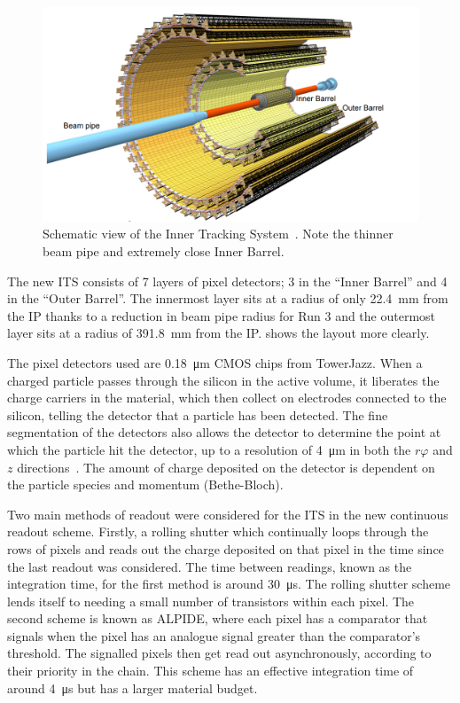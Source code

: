 \begin{figure}[h]
    \begin{center}
        \includegraphics[width=.8\textwidth]{Figs/ITS_Schematic.png}
        \caption{Schematic view of the Inner Tracking System~\cite{ITS_Upgrade_TDR}. Note the thinner beam pipe and extremely close Inner Barrel.}
        \label{fig:ITS_Schematic}
    \end{center}
\end{figure}

The new ITS consists of 7 layers of pixel detectors; 3 in the ``Inner Barrel'' and 4 in the ``Outer Barrel''. The innermost layer sits at a radius of only \SI{22.4}{\milli\metre} from the IP thanks to a reduction in beam pipe radius for Run 3 and the outermost layer sits at a radius of \SI{391.8}{\milli\metre} from the IP.  shows the layout more clearly. 

The pixel detectors used are \SI{0.18}{\micro\metre} CMOS chips from TowerJazz. When a charged particle passes through the silicon in the active volume, it liberates the charge carriers in the material, which then collect on electrodes connected to the silicon, telling the detector that a particle has been detected. The fine segmentation of the detectors also allows the detector to determine the point at which the particle hit the detector, up to a resolution of \SI{4}{\micro\metre} in both the $r\varphi$ and $z$ directions~\cite{ITS_Upgrade_TDR}. The amount of charge deposited on the detector is dependent on the particle species and momentum (Bethe-Bloch). 

Two main methods of readout were considered for the ITS in the new continuous readout scheme. Firstly, a rolling shutter which continually loops through the rows of pixels and reads out the charge deposited on that pixel in the time since the last readout was considered. The time between readings, known as the integration time, for the first method is around \SI{30}{\micro\second}. The rolling shutter scheme lends itself to needing a small number of transistors within each pixel. The second scheme is known as ALPIDE, where each pixel has a comparator that signals when the pixel has an analogue signal greater than the comparator's threshold. The signalled pixels then get read out asynchronously, according to their priority in the chain. This scheme has an effective integration time of around \SI{4}{\micro\second} but has a larger material budget. 

